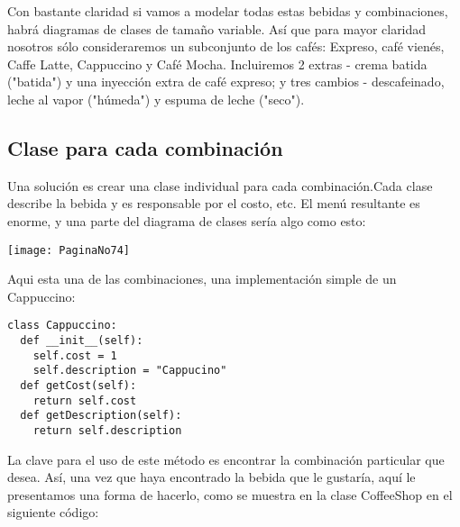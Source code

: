 Con bastante claridad si vamos a modelar todas estas bebidas y combinaciones, habrá diagramas de clases de tamaño variable. Así que para mayor claridad nosotros sólo consideraremos un subconjunto de los cafés: Expreso, café vienés, Caffe Latte,
Cappuccino y Café Mocha. 
Incluiremos 2 extras - crema batida ("batida") y una inyección extra de café expreso; y tres cambios - descafeinado, leche al vapor ("húmeda") y espuma de leche ("seco").   \newline

\subsection*{Clase para cada combinación}
\label{subsec:cpcc}

Una solución es crear una clase individual  para cada combinación.Cada clase describe la bebida y es responsable por el costo, etc. El menú resultante es enorme, y una parte del diagrama de clases sería algo como esto:    \newline

\texttt{[image: PaginaNo74]} 

Aqui esta una de las combinaciones, una implementación simple de un Cappuccino:     \newline

\begin{lstlisting} 
class Cappuccino: 
  def __init__(self): 
    self.cost = 1 
    self.description = "Cappucino" 
  def getCost(self): 
    return self.cost 
  def getDescription(self): 
    return self.description 
\end{lstlisting}

La clave para el uso de este método es encontrar la combinación particular que desea. Así, una vez que haya encontrado la bebida que le gustaría, aquí le presentamos una forma de hacerlo, como se muestra en la clase CoffeeShop en el siguiente código:     \newline

